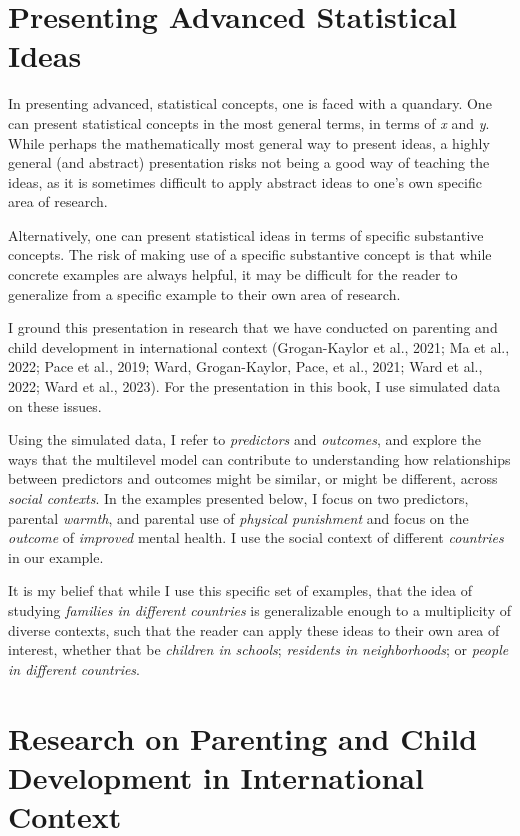 \documentclass[
  letterpaper,
  DIV=11,
  numbers=noendperiod]{scrreprt}
\begin{document}
\section{Presenting Advanced Statistical
Ideas}\label{presenting-advanced-statistical-ideas}

In presenting advanced, statistical concepts, one is faced with a
quandary. One can present statistical concepts in the most general
terms, in terms of \emph{x} and \emph{y}. While perhaps the
mathematically most general way to present ideas, a highly general (and
abstract) presentation risks not being a good way of teaching the ideas,
as it is sometimes difficult to apply abstract ideas to one's own
specific area of research.

Alternatively, one can present statistical ideas in terms of specific
substantive concepts. The risk of making use of a specific substantive
concept is that while concrete examples are always helpful, it may be
difficult for the reader to generalize from a specific example to their
own area of research.

I ground this presentation in research that we have conducted on
parenting and child development in international context (Grogan-Kaylor
et al., 2021; Ma et al., 2022; Pace et al., 2019; Ward, Grogan-Kaylor,
Pace, et al., 2021; Ward et al., 2022; Ward et al., 2023). For the
presentation in this book, I use simulated data on these issues.

Using the simulated data, I refer to \emph{predictors} and
\emph{outcomes}, and explore the ways that the multilevel model can
contribute to understanding how relationships between predictors and
outcomes might be similar, or might be different, across \emph{social
contexts}. In the examples presented below, I focus on two predictors,
parental \emph{warmth}, and parental use of \emph{physical punishment}
and focus on the \emph{outcome} of \emph{improved} mental health. I use
the social context of different \emph{countries} in our example.

It is my belief that while I use this specific set of examples, that the
idea of studying \emph{families in different countries} is generalizable
enough to a multiplicity of diverse contexts, such that the reader can
apply these ideas to their own area of interest, whether that be
\emph{children in schools}; \emph{residents in neighborhoods}; or
\emph{people in different countries}.

\section{Research on Parenting and Child Development in International
Context}\label{research-on-parenting-and-child-development-in-international-context}
\end{document}
